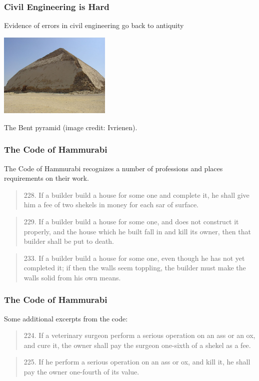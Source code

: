 \begin{frame}
\frametitle{Civil Engineering is Hard}

Evidence of errors in civil engineering go back to antiquity

\begin{center}
\includegraphics[width=0.4\textwidth]{images/pyramid-bent}
\end{center}

The Bent pyramid (image credit: Ivrienen).


\end{frame}



\begin{frame}
\frametitle{The Code of Hammurabi}

The Code of Hammurabi recognizes a number of professions and places requirements on their work.

\begin{quote}
	228.	If a builder build a house for some one and complete it, he
		shall give him a fee of two shekels in money for each sar of
		surface.
\end{quote}

\begin{quote}
	229.	If a builder build a house for some one, and does not
		construct it properly, and the house which he built fall in
		and kill its owner, then that builder shall be put to death.
\end{quote}

\begin{quote}
	233.	If a builder build a house for some one, even though he
		has not yet completed it; if then the walls seem toppling,
		the builder must make the walls solid from his own means.
\end{quote}

\end{frame}



\begin{frame}
\frametitle{The Code of Hammurabi}

Some additional excerpts from the code:

\begin{quote}
224.	If a veterinary surgeon perform a serious operation on an
		ass or an ox, and cure it, the owner shall pay the surgeon
		one-sixth of a shekel as a fee.
\end{quote}


\begin{quote}
	225.	If he perform a serious operation on an ass or ox, and kill it,
		he shall pay the owner one-fourth of its value.
\end{quote}


\end{frame}

